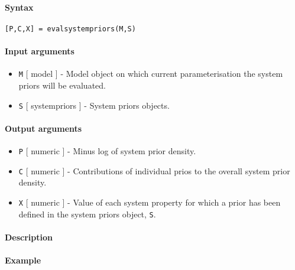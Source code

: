


	\paragraph{Syntax}

\begin{verbatim}
[P,C,X] = evalsystempriors(M,S)
\end{verbatim}

\paragraph{Input arguments}

\begin{itemize}
\item
  \texttt{M} {[} model {]} - Model object on which current
  parameterisation the system priors will be evaluated.
\item
  \texttt{S} {[} systempriors {]} - System priors objects.
\end{itemize}

\paragraph{Output arguments}

\begin{itemize}
\item
  \texttt{P} {[} numeric {]} - Minus log of system prior density.
\item
  \texttt{C} {[} numeric {]} - Contributions of individual prios to the
  overall system prior density.
\item
  \texttt{X} {[} numeric {]} - Value of each system property for which a
  prior has been defined in the system priors object, \texttt{S}.
\end{itemize}

\paragraph{Description}

\paragraph{Example}


